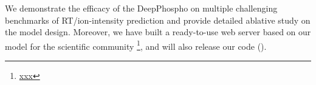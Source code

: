 We demonstrate the efficacy of the DeepPhospho on multiple challenging benchmarks of RT/ion-intensity prediction and provide detailed ablative study on the model design. Moreover, we have built a ready-to-use web server based on our model for the scientific community \footnote{\url{xxx}}, and will also release our code ().



 

 


 


